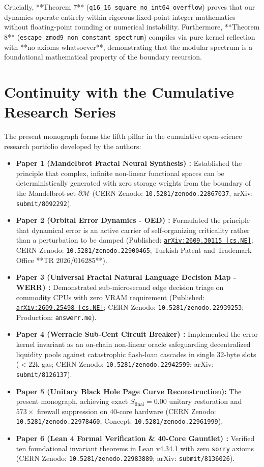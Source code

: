 \documentclass[11pt,a4paper]{article}
\begin{document}
Crucially, **Theorem 7** (\texttt{q16\_16\_square\_no\_int64\_overflow}) proves that our dynamics operate entirely within rigorous fixed-point integer mathematics without floating-point rounding or numerical instability. Furthermore, **Theorem 8** (\texttt{escape\_zmod9\_non\_constant\_spectrum}) compiles via pure kernel reflection with **no axioms whatsoever**, demonstrating that the modular spectrum is a foundational mathematical property of the boundary recursion.

\section{Continuity with the Cumulative Research Series}\label{sec:lineage}
The present monograph forms the fifth pillar in the cumulative open-science research portfolio developed by the authors:
\begin{itemize}[leftmargin=1.5em]
\item \textbf{Paper 1 (Mandelbrot Fractal Neural Synthesis) \cite{werr1}:} Established the principle that complex, infinite non-linear functional spaces can be deterministically generated with zero storage weights from the boundary of the Mandelbrot set $\partial \mathcal{M}$ (CERN Zenodo: \texttt{10.5281/zenodo.22867037}, arXiv: \texttt{submit/8092292}).
\item \textbf{Paper 2 (Orbital Error Dynamics - OED) \cite{oed}:} Formulated the principle that dynamical error is an active carrier of self-organizing criticality rather than a perturbation to be damped (Published: \href{https://arxiv.org/abs/2609.30115}{\texttt{arXiv:2609.30115 [cs.NE]}}; CERN Zenodo: \texttt{10.5281/zenodo.22900465}; Turkish Patent and Trademark Office **TR 2026/016285**).
\item \textbf{Paper 3 (Universal Fractal Natural Language Decision Map - WERR) \cite{werr_arxiv,werr2}:} Demonstrated sub-microsecond edge decision triage on commodity CPUs with zero VRAM requirement (Published: \href{https://arxiv.org/abs/2609.25498}{\texttt{arXiv:2609.25498 [cs.NE]}}; CERN Zenodo: \texttt{10.5281/zenodo.22939253}; Production: \texttt{answerr.me}).
\item \textbf{Paper 4 (Werracle Sub-Cent Circuit Breaker) \cite{werr3}:} Implemented the error-kernel invariant as an on-chain non-linear oracle safeguarding decentralized liquidity pools against catastrophic flash-loan cascades in single 32-byte slots ($<22\text{k}$ gas; CERN Zenodo: \texttt{10.5281/zenodo.22942599}; arXiv: \texttt{submit/8126137}).
\item \textbf{Paper 5 (Unitary Black Hole Page Curve Reconstruction):} The present monograph, achieving exact $S_{\text{final}} = 0.00$ unitary restoration and $573\times$ firewall suppression on 40-core hardware (CERN Zenodo: \texttt{10.5281/zenodo.22978460}, Concept: \texttt{10.5281/zenodo.22961999}).
\item \textbf{Paper 6 (Lean 4 Formal Verification \& 40-Core Gauntlet) \cite{werr_lean}:} Verified ten foundational invariant theorems in Lean v4.34.1 with zero \texttt{sorry} axioms (CERN Zenodo: \texttt{10.5281/zenodo.22983889}; arXiv: \texttt{submit/8136026}).
\end{itemize}
\end{document}
